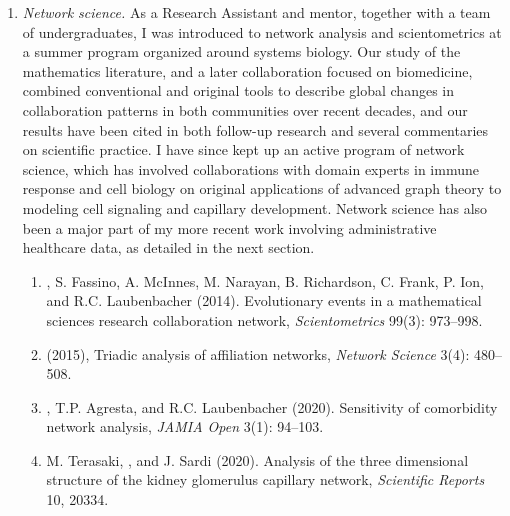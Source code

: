 \documentclass{nihbiosketch}
\begin{document}
\begin{enumerate}

\item \emph{Network science.}
As a Research Assistant and mentor, together with a team of undergraduates, I was introduced to network analysis and scientometrics at a summer program organized around systems biology.
Our study of the mathematics literature, and a later collaboration focused on biomedicine, combined conventional and original tools to describe global changes in collaboration patterns in both communities over recent decades, and our results have been cited in both follow-up research and several commentaries on scientific practice.
I have since kept up an active program of network science, which has involved collaborations with domain experts in immune response and cell biology on original applications of advanced graph theory to modeling cell signaling and capillary development.
Network science has also been a major part of my more recent work involving administrative healthcare data, as detailed in the next section.

\begin{enumerate}
\item {}, S. Fassino, A. McInnes, M. Narayan, B. Richardson, C. Frank, P. Ion, and R.C. Laubenbacher (2014). Evolutionary events in a mathematical sciences research collaboration network, \emph{Scientometrics} 99(3): 973--998.
\item {} (2015), Triadic analysis of affiliation networks, \emph{Network Science} 3(4): 480--508.
\item {}, T.P. Agresta, and R.C. Laubenbacher (2020). Sensitivity of comorbidity network analysis, \emph{JAMIA Open} 3(1): 94--103.
\item M. Terasaki, , and J. Sardi (2020). Analysis of the three dimensional structure of the kidney glomerulus capillary network, \emph{Scientific Reports} 10, 20334.
\end{enumerate}


\end{enumerate}
\end{document}
